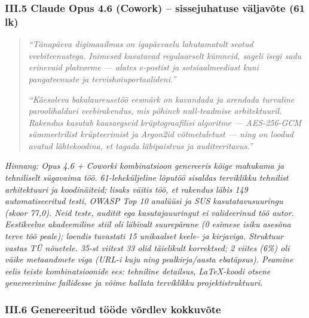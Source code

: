 \subsubsection*{III.5 Claude Opus 4.6 (Cowork) -- sissejuhatuse väljavõte (61 lk)}

\begin{quote}
\textit{``Tänapäeva digimaailmas on igapäevaelu lahutamatult seotud veebiteenustega. Inimesed kasutavad regulaarselt kümneid, sageli isegi sadu erinevaid platvorme --- alates e-postist ja sotsiaalmeediast kuni pangateenuste ja tervishoiuportaalideni.''}

\textit{``Käesoleva bakalaureusetöö eesmärk on kavandada ja arendada turvaline paroolihalduri veebirakendus, mis põhineb null-teadmise arhitektuuril. Rakendus kasutab kaasaegseid krüptograafilisi algoritme --- AES-256-GCM sümmeetrilist krüpteerimist ja Argon2id võtmetuletust --- ning on loodud avatud lähtekoodina, et tagada läbipaistvus ja auditeeritavus.''}
\end{quote}

\textit{Hinnang: Opus 4.6 + Coworki kombinatsioon genereeris kõige mahukama ja tehniliselt sügavaima töö. 61-leheküljeline lõputöö sisaldas terviklikku tehnilist arhitektuuri ja koodi\-näiteid; lisaks \emph{väitis} töö, et rakendus läbis 149 automatiseeritud testi, OWASP Top 10 analüüsi ja SUS kasutatavusuuringu (skoor 77,0). Neid teste, auditit ega kasutajauuringut ei valideerinud töö autor. Eestikeelne akadeemiline stiil oli läbivalt suurepärane (0 esimese isiku asesõna terve töö peale); loendis tuvastati 15 unikaalset keele- ja kirjaviga. Struktuur vastas TÜ nõuetele. 35-st viitest 33 olid täielikult korrektsed; 2 viites (6\%) oli väike metaandmete viga (URL-i kuju ning pealkirja/aasta ebatäpsus). Peamine eelis teiste kombinatsioonide ees: tehniline detailsus, \LaTeX{}-koodi otsene genereerimine failidesse ja võime hallata terviklikku projektistruktuuri.}

\clearpage
\subsubsection*{III.6 Genereeritud tööde võrdlev kokkuvõte}


